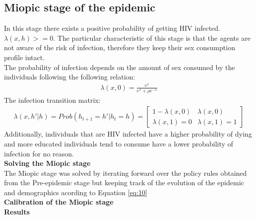 \subsection{Miopic stage of the epidemic}
In this stage there exists a positive probability of getting HIV infected. $\lambda(x,h) >=0$. The particular characteristic of this stage is that the agents are not aware of the risk of infection, therefore they keep their sex consumption profile intact.\\
The probability of infection depends on the amount of sex consumed by the individuals following the following relation:
\begin{align}
    \lambda(x,0)=\frac{e^{x}}{e^{x}+\rho e^{-x}}
\end{align}
The infection transition matrix: 
\begin{align}
     \lambda(x,h'|h) = Prob(h_{t+1}=h'|h_{t}=h)=    \begin{bmatrix}%
    1-\lambda(x,0) & \lambda(x,0)\\
    \lambda(x,1)=0 & \lambda(x,1)=1
    \end{bmatrix}
\end{align}
Additionally, individuals that are HIV infected have a higher probability of dying and more educated individuals tend to consume have a lower probability of infection for no reason.\\
\textbf{Solving the Miopic stage}\\
The Miopic stage was solved by iterating forward over the policy rules obtained from the Pre-epidemic stage but keeping track of the evolution of the epidemic and demographics acording to Equation \ref{eq:10}\\
\textbf{Calibration of  the Miopic stage}\\

\textbf{Results}\\

